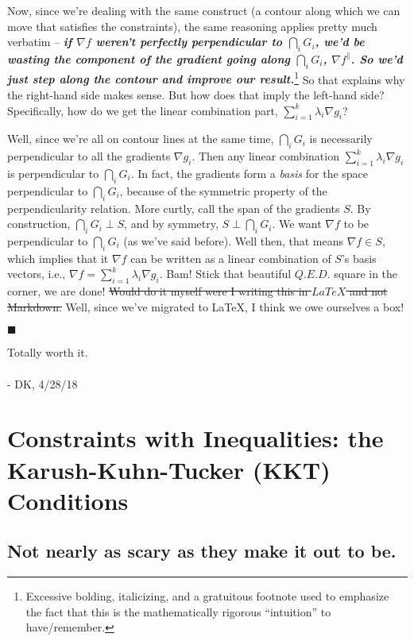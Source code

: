\documentclass[letterpaper,12pt]{report}
\begin{document}
Now, since we're dealing with the same construct (a contour along which
we can move that satisfies the constraints), the same reasoning applies
pretty much verbatim -- \emph{\textbf{if \(\nabla f\) weren't perfectly
perpendicular to \(\bigcap _i G_i\), we'd be wasting the component of
the gradient going along \(\bigcap _i G_i\), \(\nabla f ^{\parallel}\).
So we'd just step along the contour and improve our result.}}\footnote{
  Excessive bolding, italicizing, and a gratuitous footnote 
  used to emphasize the fact that this is the
  mathematically rigorous ``intuition'' to have/remember.
}
So that explains why the right-hand side makes sense. But how does that
imply the left-hand side? Specifically, how do we get the linear
combination part, \( \sum_{i=1}^k \lambda _i \nabla g_i \)?

Well, since we're all on contour lines at the same time,
\(\bigcap _i G_i\) is necessarily perpendicular to all the gradients
\(\nabla g_i\). Then any linear combination \(\sum_{i=1}^k
\lambda _i \nabla g_i \) is perpendicular to \(\bigcap _i G_i\).
In fact, the gradients form a \emph{basis} for the space perpendicular
to \(\bigcap _i G_i\), because of the symmetric property of the
perpendicularity relation. More curtly, call the span of the gradients
\(S\). By construction, \(\bigcap _i G_i \perp S\), and by symmetry, \(S
\perp \bigcap _i G_i\). We want \(\nabla f\) to be perpendicular to
\(\bigcap _i G_i\) (as we've said before). Well then, that means
\(\nabla f \in S\), which implies that it \(\nabla f\) can be written as
a linear combination of \(S\)'s basis vectors, i.e., \( \nabla f =
\sum _{i=1}^k \lambda _i \nabla g_i \). Bam! Stick that beautiful
\(Q.E.D.\) square in the corner, we are done! \sout{Would do it myself were I
writing this in \(LaTeX\) and not Markdown.} 
Well, since we've migrated to LaTeX, I think we owe ourselves a box!
\begin{flushright}$\blacksquare$\end{flushright}
Totally worth it.
\\
\\
- DK, 4/28/18

\newpage

\section{Constraints with Inequalities: the Karush-Kuhn-Tucker (KKT)
Conditions}\label{constraints-with-inequalities-the-karush-kuhn-tucker-kkt-conditions}

\subsection{Not nearly as scary as they make it out to
be.}\label{not-nearly-as-scary-as-they-make-it-out-to-be.}
\end{document}
